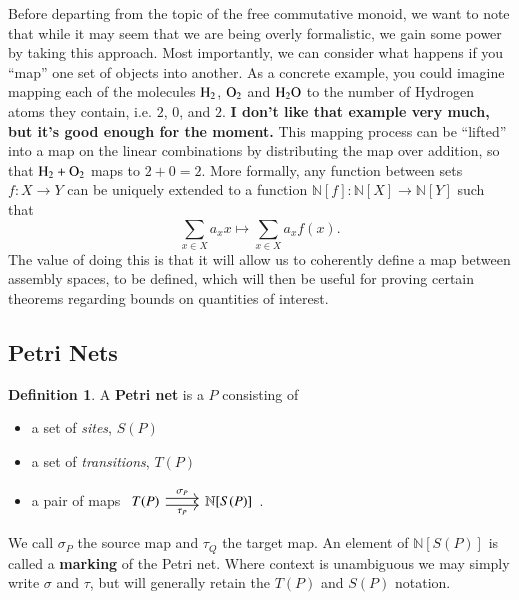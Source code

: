 \documentclass[aps,prd,onecolumn,nofootinbib,letterpaper,preprintnumbers,superscriptaddress,eqsecnum]{revtex4}
\theoremstyle{definition}
\newtheorem{definition}{Definition}
\newcommand{\N}{\mathbb{N}}
\begin{document}
Before departing from the topic of the free commutative monoid, we want to note that while it may seem that we are being overly formalistic, we gain some power by taking this approach.
Most importantly, we can consider what happens if you ``map'' one set of objects into another. 
As a concrete example, you could imagine mapping each of the molecules $\ce{H_2}$, $\ce{O_2}$ and $\ce{H_2O}$ to the number of Hydrogen atoms they contain, i.e. $2$, $0$, and $2$.
\textbf{I don't like that example very much, but it's good enough for the moment.}
This mapping process can be ``lifted'' into a map on the linear combinations by distributing the map over addition, so that $\ce{H_2} + \ce{O_2}$ maps to $2 + 0 = 2$. More formally, any function between sets $f : X \rightarrow Y$ can be uniquely extended to a function $\N[f] : \N[X] \rightarrow \N[Y]$ such that
\begin{equation*}
    \sum_{x \in X} a_x x \mapsto \sum_{x \in X} a_x f(x).
\end{equation*}
The value of doing this is that it will allow us to coherently define a map between assembly spaces, to be defined, which will then be useful for proving certain theorems regarding bounds on quantities of interest.

\subsection{Petri Nets}

\begin{definition}\label{def:petri}
    A \textbf{Petri net} is a $P$ consisting of
    \begin{itemize}
        \item a set of \textit{sites}, $S(P)$
        \item a set of \textit{transitions}, $T(P)$
        \item a pair of maps $\begin{tikzcd}
                T(P)
                \arrow[r, shift left = 1, "\sigma_P"]
                \arrow[r, shift right = 1, "\tau_P", swap]
                &
                \N[S(P)]
        \end{tikzcd}$.
    \end{itemize}
    We call $\sigma_P$ the source map and $\tau_Q$ the target map.
    An element of $\N[S(P)]$ is called a \textbf{marking} of the Petri net.
    Where context is unambiguous we may simply write $\sigma$ and $\tau$, but will generally retain the $T(P)$ and $S(P)$ notation.
\end{definition}
\end{document}
